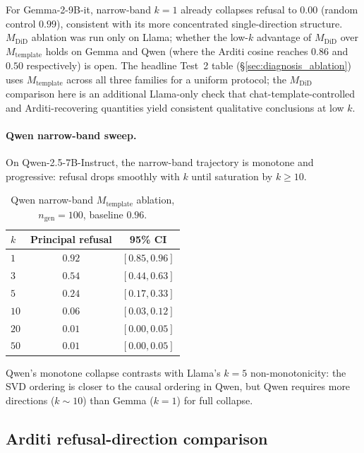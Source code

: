 \documentclass[10pt]{article}
\theoremstyle{definition}
\theoremstyle{remark}
\begin{document}
For Gemma-2-9B-it, narrow-band $k=1$ already collapses
refusal to $\mathbf{0.00}$ (random control $0.99$),
consistent with its more concentrated single-direction
structure.  $M_{\mathrm{DiD}}$ ablation was run only on
Llama; whether the low-$k$ advantage of
$M_{\mathrm{DiD}}$ over $M_{\mathrm{template}}$ holds on
Gemma and Qwen (where the Arditi cosine reaches $0.86$
and $0.50$ respectively) is open.  The headline Test~2
table (\S\ref{sec:diagnosis_ablation}) uses
$M_{\mathrm{template}}$ across all three families for a
uniform protocol; the $M_{\mathrm{DiD}}$ comparison
here is an additional Llama-only check that
chat-template-controlled and Arditi-recovering
quantities yield consistent qualitative conclusions at
low $k$.

\paragraph{Qwen narrow-band sweep.}
\label{app:abl_sweep_qwen}
On Qwen-2.5-7B-Instruct, the narrow-band trajectory is
monotone and progressive: refusal drops smoothly with
$k$ until saturation by $k\!\geq\!10$.

\begin{table}[h]\centering
\caption{Qwen narrow-band $M_{\mathrm{template}}$
ablation, $n_{\mathrm{gen}}=100$, baseline $0.96$.}
\label{tab:ablation_qwen}
\begin{tabular}{@{}lcc@{}}
\toprule
$k$ & Principal refusal & 95\% CI \\
\midrule
$1$  & $0.92$ & $[0.85, 0.96]$ \\
$3$  & $0.54$ & $[0.44, 0.63]$ \\
$5$  & $0.24$ & $[0.17, 0.33]$ \\
$10$ & $0.06$ & $[0.03, 0.12]$ \\
$20$ & $\mathbf{0.01}$ & $[0.00, 0.05]$ \\
$50$ & $\mathbf{0.01}$ & $[0.00, 0.05]$ \\
\bottomrule
\end{tabular}
\end{table}

Qwen's monotone collapse contrasts with Llama's $k=5$
non-monotonicity: the SVD ordering is closer to the
causal ordering in Qwen, but Qwen requires more
directions ($k\sim 10$) than Gemma ($k=1$) for full
collapse.

\subsection{Arditi refusal-direction comparison}
\label{app:arditi}
\end{document}

